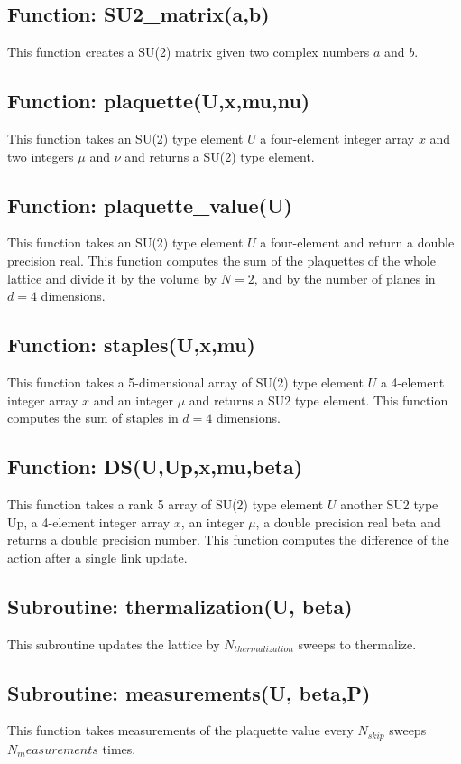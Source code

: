 \documentclass[12pt,a4paper]{article}
\begin{document}
  \subsection{Function: SU2\_matrix(a,b)}
 This function creates a SU(2) matrix given two complex numbers $a$ and $b$.
  \subsection{Function: plaquette(U,x,mu,nu)}
 This function takes an SU(2) type element $U$ a four-element integer array $x$ and two integers $\mu$ and $\nu$ and returns a SU(2) type element.
   \subsection{Function: plaquette\_value(U)}
 This function takes an SU(2) type element $U$ a four-element and return a double precision real. This function computes the sum of the plaquettes of the whole lattice and divide it by the volume by $N=2$, and by the number of planes in $d = 4$ dimensions.
    \subsection{Function: staples(U,x,mu)}
 This function takes a 5-dimensional array of SU(2) type element $U$ a 4-element integer array $x$ and an integer $\mu$ and returns a SU2 type element. This function computes the sum of staples in $d =4$ dimensions.
     \subsection{Function: DS(U,Up,x,mu,beta)}
 This function takes a rank 5 array of SU(2) type element $U$ another SU2 type Up, a 4-element integer array $x$, an integer $\mu$, a double precision real beta and returns a double precision number. This function computes the difference of the action after a single link update.
	\subsection{Subroutine: thermalization(U, beta)}
	This subroutine updates the lattice by $N_{thermalization}$ sweeps to thermalize.
	\subsection{Subroutine: measurements(U, beta,P)}
	This function takes measurements of the plaquette value every $N_{skip}$ sweeps $N_measurements$ times.	 
	
\end{document}
